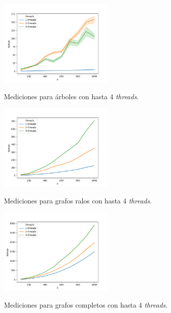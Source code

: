 \begin{figure}[h]
\caption{Mediciones para árboles con hasta 4 \textit{threads}.}
\centering
\includegraphics[width=0.5\textwidth]{imagenes/arbol-124.png} \\%
\label{fig:arboles124}
\end{figure}

\begin{figure}[h]
\caption{Mediciones para grafos ralos con hasta 4 \textit{threads}.}
\centering
\includegraphics[width=0.5\textwidth]{imagenes/ralo-124.png} \\%
\label{fig:ralos124}
\end{figure}

\begin{figure}[h]
\caption{Mediciones para grafos completos con hasta 4 \textit{threads}.}
\centering
\includegraphics[width=0.5\textwidth]{imagenes/completo-124.png} \\%
\label{fig:completos124}
\end{figure}

